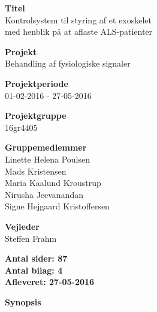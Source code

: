 \begin{minipage}[t]{0.48\textwidth}
\textbf{Titel} \\[5pt]\hspace*{2ex} 
Kontrolsystem til styring af et exoskelet \\\bigskip\hspace*{2ex}
med henblik på at aflaste ALS-patienter

 

\textbf{Projekt} \\[5pt]\bigskip\hspace*{2ex}
Behandling af fysiologiske signaler%

\textbf{Projektperiode} \\[5pt]\bigskip\hspace{2ex}
01-02-2016 - 27-05-2016

\textbf{Projektgruppe} \\[5pt]\bigskip\hspace{2ex}
16gr4405

\textbf{Gruppemedlemmer} \\[5pt]\hspace*{2ex}
Linette Helena Poulsen \\\hspace*{2ex}
Mads Kristensen \\\hspace*{2ex}
Maria Kaalund Kroustrup \\\hspace*{2ex}
Nirusha Jeevanandan \\\bigskip\hspace*{2ex}
Signe Hejgaard Kristoffersen %


\textbf{Vejleder} \\[5pt]\bigskip\hspace*{2ex}
Steffen Frahm %


\vspace*{1cm}

\textbf{Antal sider: 87} \\
\textbf{Antal bilag: 4} \\ 
\textbf{Afleveret: 27-05-2016}

\end{minipage}
\hfill
\begin{minipage}[t]{0.483\textwidth}
\textbf{Synopsis} \\[5pt]
\fbox{\parbox{8cm}{\bigskip\bigskip}}
\end{minipage}

